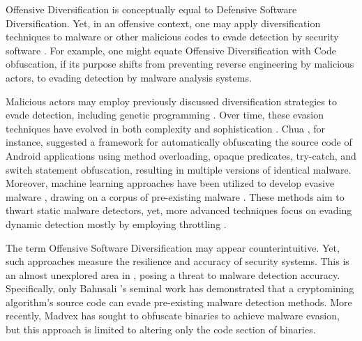 \begin{strategy}   
    Offensive Diversification is conceptually equal to Defensive Software Diversification.
    Yet, in an offensive context, one may apply diversification techniques to malware or other malicious codes to evade detection by security software \cite{8714698}.
    For example, one might equate Offensive Diversification with Code obfuscation, if its purpose shifts from preventing reverse engineering by malicious actors, to evading detection by malware analysis systems.
    
\end{strategy}


Malicious actors may employ previously discussed diversification strategies to evade detection, including genetic programming \cite{castro2019aimed}.
Over time, these evasion techniques have evolved in both complexity and sophistication \cite{Aghakhani2020WhenMI}.
Chua \etal \cite{chua}, for instance, suggested a framework for automatically obfuscating the source code of Android applications using method overloading, opaque predicates, try-catch, and switch statement obfuscation, resulting in multiple versions of identical malware.
Moreover, machine learning approaches have been utilized to develop evasive malware \cite{2021arXiv211111487D}, drawing on a corpus of pre-existing malware \cite{Bostani2021EvadeDroidAP}.
These methods aim to thwart static malware detectors, yet, more advanced techniques focus on evading dynamic detection mostly by employing throttling \cite{Lu2013WeaknessesID, payer2014embracing}.


The term Offensive Software Diversification may appear counterintuitive.
Yet, such approaches measure the resilience and accuracy of security systems. 
This is an almost unexplored area in \Wasm, posing a threat to malware detection accuracy. 
Specifically, only Bahnsali \etal's seminal work\cite{10.1145/3507657.3528560} has demonstrated that a cryptomining algorithm's source code can evade pre-existing malware detection methods. 
More recently, Madvex \cite{madvex} has sought to obfuscate \Wasm binaries to achieve malware evasion, but this approach is limited to altering only the code section of \Wasm binaries.


